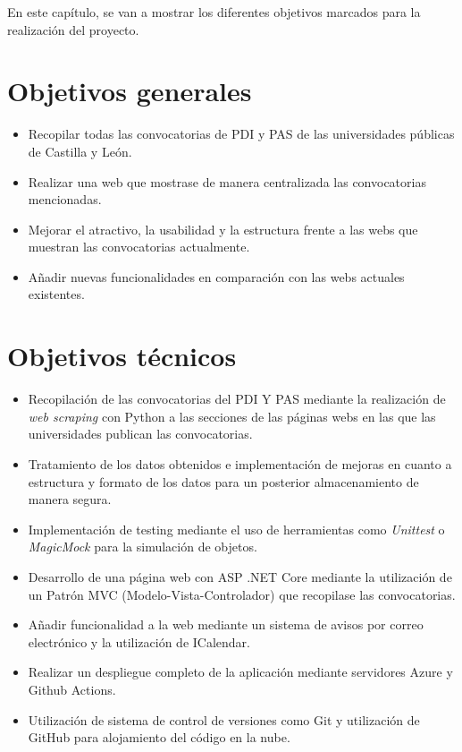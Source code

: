 En este capítulo, se van a mostrar los diferentes objetivos marcados para la realización del proyecto.
\section{Objetivos generales}
\begin{itemize}
    \item Recopilar todas las convocatorias de PDI y PAS de las universidades públicas de Castilla y León.
    \item Realizar una web que mostrase de manera centralizada las convocatorias mencionadas.
    \item Mejorar el atractivo, la usabilidad y la estructura frente a las webs que muestran las convocatorias actualmente.
    \item Añadir nuevas funcionalidades en comparación con las webs actuales existentes.
\end{itemize}
\section{Objetivos técnicos}
\begin{itemize}
    \item Recopilación de las convocatorias del PDI Y PAS mediante la realización de \textit{web scraping} con Python a las secciones de las páginas webs en las que las universidades publican las convocatorias.
    \item Tratamiento de los datos obtenidos e implementación de mejoras en cuanto a estructura y formato de los datos para un posterior almacenamiento de manera segura.
    \item Implementación de testing mediante el uso de herramientas como \textit{Unittest} o \textit{MagicMock} para la simulación de objetos.
    \item Desarrollo de una página web con ASP .NET Core mediante la utilización de un Patrón MVC (Modelo-Vista-Controlador) que recopilase las convocatorias. 
    \item Añadir funcionalidad a la web mediante un sistema de avisos por correo electrónico y la utilización de ICalendar.
    \item Realizar un despliegue completo de la aplicación mediante servidores Azure y Github Actions.
    \item Utilización de sistema de control de versiones como Git y utilización de GitHub para alojamiento del código en la nube.
\end{itemize}

